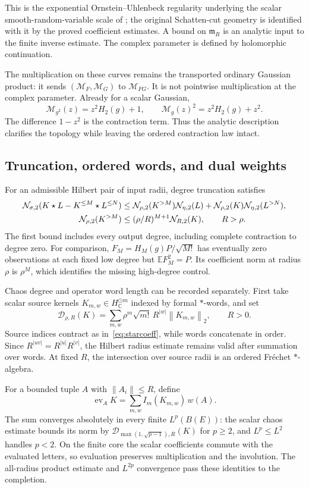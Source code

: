 \documentclass[11pt,a4paper]{amsart}
\numberwithin{equation}{section}
\theoremstyle{definition}
\theoremstyle{remark}
\newcommand{\C}{\mathbb C}
\newcommand{\E}{\mathbb E}
\newcommand{\norm}[1]{\left\lVert#1\right\rVert}
\begin{document}
This is the exponential Ornstein--Uhlenbeck regularity underlying the scalar smooth-random-variable scale of \cite{PT}; the original Schatten-cut geometry is identified with it by the proved coefficient estimates. A bound on $\mathfrak m_R$ is an analytic input to the finite inverse estimate. The complex parameter is defined by holomorphic continuation.

The multiplication on these curves remains the transported ordinary Gaussian product: it sends $(\mathscr M_F,\mathscr M_G)$ to $\mathscr M_{FG}$. It is not pointwise multiplication at the complex parameter. Already for a scalar Gaussian,
\[
 \mathscr M_{g^2}(z)=z^2H_2(g)+1,
 \qquad \mathscr M_g(z)^2=z^2H_2(g)+z^2.
\]
The difference $1-z^2$ is the contraction term. Thus the analytic description clarifies the topology while leaving the ordered contraction law intact.

\subsection{Truncation, ordered words, and dual weights}
For an admissible Hilbert pair of input radii, degree truncation satisfies
\begin{align}\label{eq:chaostailproduct}
 \mathcal N_{\sigma,2}(K\star L-K^{\le M}\star L^{\le N})
 &\le\mathcal N_{\rho,2}(K^{>M})\mathcal N_{\eta,2}(L)
      +\mathcal N_{\rho,2}(K)\mathcal N_{\eta,2}(L^{>N}),\notag\\
 \mathcal N_{\rho,2}(K^{>M})
 &\le(\rho/R)^{M+1}\mathcal N_{R,2}(K),\qquad R>\rho.
\end{align}
The first bound includes every output degree, including complete contraction to degree zero. For comparison, $F_M=H_M(g)P/\sqrt{M!}$ has eventually zero observations at each fixed low degree but $\E F_M^2=P$. Its coefficient norm at radius $\rho$ is $\rho^M$, which identifies the missing high-degree control.

Chaos degree and operator word length can be recorded separately. First take scalar source kernels $K_{m,w}\in H_\C^{\odot m}$ indexed by formal $*$-words, and set
\[
 \mathcal D_{\rho,R}(K)=\sum_{m,w}\rho^m\sqrt{m!}\,R^{|w|}\norm{K_{m,w}}_2,
 \qquad R>0.
\]
Source indices contract as in~\eqref{eq:starcoeff}, while words concatenate in order. Since $R^{|uv|}=R^{|u|}R^{|v|}$, the Hilbert radius estimate remains valid after summation over words. At fixed $R$, the intersection over source radii is an ordered Fr\'echet $*$-algebra.

For a bounded tuple $A$ with $\norm{A_i}\le R$, define
\[
 \operatorname{ev}_A K=\sum_{m,w}I_m(K_{m,w})\,w(A).
\]
The sum converges absolutely in every finite $L^p(B(E))$: the scalar chaos estimate bounds its norm by $\mathcal D_{\max(1,\sqrt{p-1}),R}(K)$ for $p\ge2$, and $L^p\le L^2$ handles $p<2$. On the finite core the scalar coefficients commute with the evaluated letters, so evaluation preserves multiplication and the involution. The all-radius product estimate and $L^{2p}$ convergence pass these identities to the completion.
\end{document}
